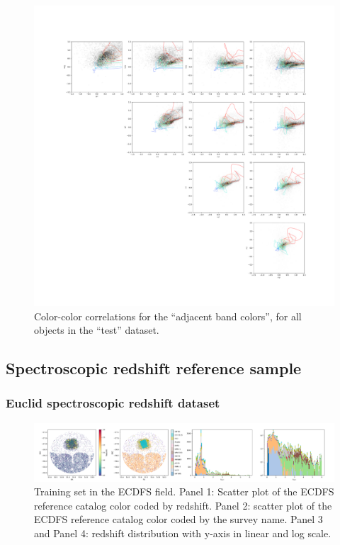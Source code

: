 \begin{figure}
    \centering
    \includegraphics[width=\linewidth]{figures/color_v_color.pdf}
    \caption{Color-color correlations for the ``adjacent band colors'', for all objects in the ``test'' dataset.}
    \label{fig:dp_color_v_color}
\end{figure}

\pagebreak


\subsection{Spectroscopic redshift reference sample}
\label{sec:data:reference}


\subsubsection{Euclid spectroscopic redshift dataset}
\label{sec:data:euclid}

\begin{figure}
    \centering
    \includegraphics[width=1.0\linewidth]{figures/training_set_info.png}
    \caption{Training set in the ECDFS field. Panel 1: Scatter plot of the ECDFS reference catalog color coded by redshift. Panel 2: scatter plot of the ECDFS reference catalog color coded by the survey name. Panel 3 and Panel 4: redshift distribution with y-axis in linear and log scale. }
    \label{fig:enter-label}
\end{figure}

